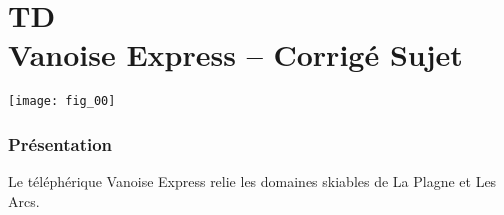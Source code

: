 \chapter*{TD  \\ 
Vanoise Express -- 
\ifprof Corrigé \else Sujet \fi}

\iflivret {} \else
\ifprof  {} \else \fi
\fi

\setcounter{question}{0}

\begin{marginfigure} %
\centering
\texttt{[image: fig\_00]}
\end{marginfigure}






\subsection*{Présentation}


Le téléphérique Vanoise Express relie les domaines skiables de La Plagne et Les Arcs.%

	



